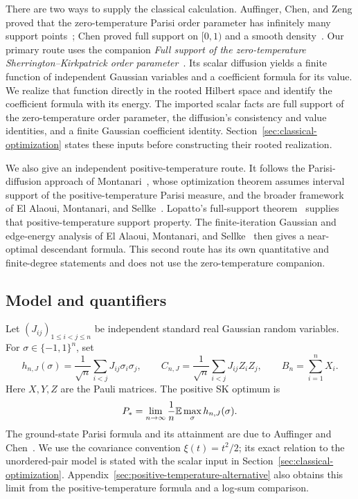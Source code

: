 There are two ways to supply the classical calculation. Auffinger,
Chen, and Zeng proved that the zero-temperature Parisi order parameter
has infinitely many support points~\cite[Theorem~1]{ACZ2020}; Chen
proved full support on $[0,1)$ and a smooth
density~\cite[Theorem~1.3]{Chen2026}.
Our primary route uses the companion
\emph{Full support of the zero-temperature Sherrington--Kirkpatrick
order parameter}~\cite{SKSupport2026}. Its scalar diffusion yields a
finite function of independent Gaussian variables and a coefficient
formula for its value. We realize that function directly in the
rooted Hilbert space and identify the coefficient formula with its
energy. The imported scalar facts are full support of the zero-temperature
order parameter, the diffusion's consistency and value identities,
and a finite Gaussian coefficient identity.
Section~\ref{sec:classical-optimization} states these inputs before
constructing their rooted realization.

We also give an independent positive-temperature route.
It follows the Parisi-diffusion approach of
Montanari~\cite{Montanari2019}, whose optimization theorem assumes
interval support of the positive-temperature Parisi measure, and the
broader framework of El Alaoui, Montanari, and Sellke~\cite{AMS2020}.
Lopatto's full-support theorem~\cite{Lopatto2026} supplies that
positive-temperature support property. The finite-iteration
Gaussian and edge-energy analysis of El Alaoui, Montanari, and
Sellke~\cite{EAMS2023} then gives a near-optimal descendant formula.
This second route has its own quantitative and finite-degree
statements and does not use the zero-temperature companion.

\subsection{Model and quantifiers}

Let $(J_{ij})_{1\le i<j\le n}$ be independent standard real Gaussian random
variables. For $\sigma\in\{-1,1\}^n$, set
\begin{equation}\label{eq:sk-model}
 h_{n,J}(\sigma)=\frac1{\sqrt n}\sum_{i<j}J_{ij}\sigma_i\sigma_j,
 \qquad
 C_{n,J}=\frac1{\sqrt n}\sum_{i<j}J_{ij}Z_iZ_j,
 \qquad B_n=\sum_{i=1}^nX_i.
\end{equation}
Here $X,Y,Z$ are the Pauli matrices. The positive SK optimum is
\begin{equation}\label{eq:parisi-constant}
 P_*=\lim_{n\to\infty}\frac1n\mathbb E\max_{\sigma}h_{n,J}(\sigma).
\end{equation}
The ground-state Parisi formula and its attainment are due to
Auffinger and Chen~\cite{AC2017}. We use the covariance convention
$\xi(t)=t^2/2$; its exact relation to the unordered-pair model is
stated with the scalar input in Section~\ref{sec:classical-optimization}.
Appendix~\ref{sec:positive-temperature-alternative} also obtains this
limit from the positive-temperature formula and a log-sum comparison.

